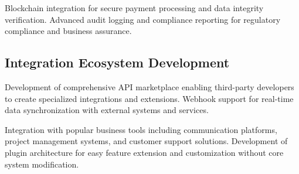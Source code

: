 \documentclass[12pt,a4paper]{report}
\begin{document}
Blockchain integration for secure payment processing and data integrity verification. Advanced audit logging and compliance reporting for regulatory compliance and business assurance.

\subsection{Integration Ecosystem Development}

Development of comprehensive API marketplace enabling third-party developers to create specialized integrations and extensions. Webhook support for real-time data synchronization with external systems and services.

Integration with popular business tools including communication platforms, project management systems, and customer support solutions. Development of plugin architecture for easy feature extension and customization without core system modification.
\end{document}
